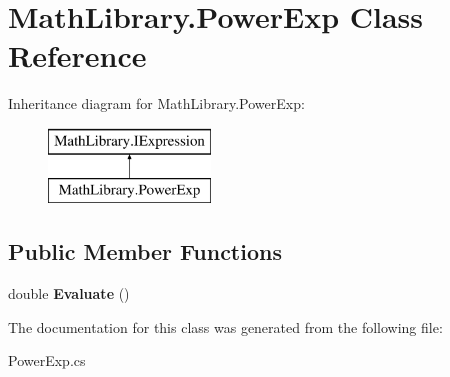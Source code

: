 \hypertarget{class_math_library_1_1_power_exp}{}\section{Math\+Library.\+Power\+Exp Class Reference}
\label{class_math_library_1_1_power_exp}
Inheritance diagram for Math\+Library.\+Power\+Exp\+:\begin{figure}[H]
\begin{center}
\leavevmode
\includegraphics[height=2.000000cm]{class_math_library_1_1_power_exp}
\end{center}
\end{figure}
\subsection*{Public Member Functions}
\begin{DoxyCompactItemize}
\item 
\mbox{\label{class_math_library_1_1_power_exp_aa17419ecd3be34ce419aa28950a8225f}} 
double {\bfseries Evaluate} ()
\end{DoxyCompactItemize}


The documentation for this class was generated from the following file\+:\begin{DoxyCompactItemize}
\item 
Power\+Exp.\+cs\end{DoxyCompactItemize}
